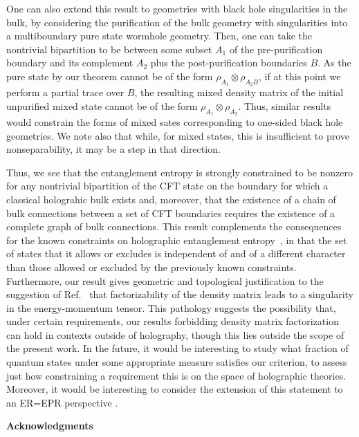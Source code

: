 \documentclass[12pt,english]{article}
\newcommand{\Ref}[1]{Ref.~\cite{#1}}
\begin{document}
One can also extend this result to geometries with black hole singularities in the bulk, by considering the purification of the bulk geometry with singularities into a multiboundary pure state wormhole geometry. Then, one can take the nontrivial bipartition to be between some subset $A_1$ of the pre-purification boundary and its complement $A_2$ plus the post-purification boundaries $B$. As the pure state by our theorem cannot be of the form $\rho_{A_1}\otimes\rho_{A_2B}$, if at this point we perform a partial trace over $B$, the resulting mixed density matrix of the initial unpurified mixed state cannot be of the form $\rho_{A_1}\otimes\rho_{A_2}$. Thus, similar results would constrain the forms of mixed sates corresponding to one-sided black hole geometries. We note also that while, for mixed states, this is insufficient to prove nonseparability, it may be a step in that direction.

Thus, we see that the entanglement entropy is strongly constrained to be nonzero for any nontrivial bipartition of the CFT state on the boundary for which a classical holograhic bulk exists and, moreover, that the existence of a chain of bulk connections between a set of CFT boundaries requires the existence of a complete graph of bulk connections. This result complements the consequences for the known constraints on holographic entanglement entropy~\cite{Hayden:2011ag, Bao:2015nqa, Bao:2015bfa}, in that the set of states that it allows or excludes is independent of and of a different character than those allowed or excluded by the previously known constraints. Furthermore, our result gives geometric and topological justification to the suggestion of \Ref{Czech:2012be} that factorizability of the density matrix leads to a singularity in the energy-momentum tensor. This pathology suggests the possibility that, under certain requirements, our results forbidding density matrix factorization can hold in contexts outside of holography, though this lies outside the scope of the present work. In the future, it would be interesting to study what fraction of quantum states under some appropriate measure satisfies our criterion, to assess just how constraining a requirement this is on the space of holographic theories. Moreover, it would be interesting to consider the extension of this statement to an ER=EPR perspective \cite{Maldacena:2013xja, Remmen:2016wax}.

\begin{center} 
 {\bf Acknowledgments}
 \end{center}
 \noindent 
\end{document}
